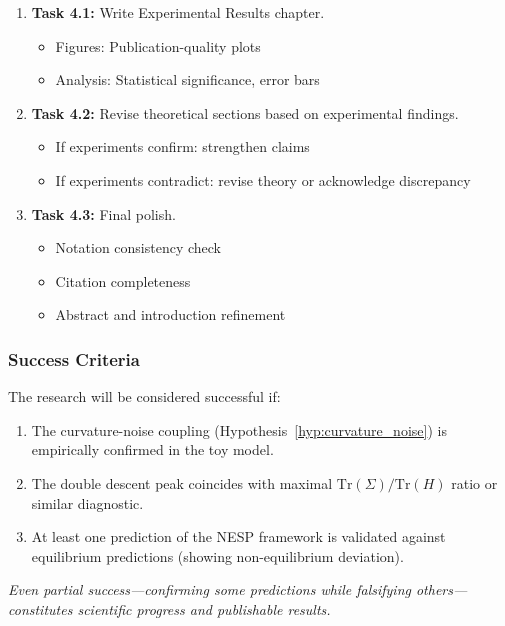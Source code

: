 \documentclass[
  journal=largetwo,
  year=2025,
  volume=37,
]{cup-journal}
\begin{document}
\begin{enumerate}
    \item[$\square$] \textbf{Task 4.1:} Write Experimental Results chapter.
    \begin{itemize}
        \item Figures: Publication-quality plots
        \item Analysis: Statistical significance, error bars
    \end{itemize}
    
    \item[$\square$] \textbf{Task 4.2:} Revise theoretical sections based on experimental findings.
    \begin{itemize}
        \item If experiments confirm: strengthen claims
        \item If experiments contradict: revise theory or acknowledge discrepancy
    \end{itemize}
    
    \item[$\square$] \textbf{Task 4.3:} Final polish.
    \begin{itemize}
        \item Notation consistency check
        \item Citation completeness
        \item Abstract and introduction refinement
    \end{itemize}
\end{enumerate}

\subsubsection{Success Criteria}

The research will be considered successful if:
\begin{enumerate}
    \item The curvature-noise coupling (Hypothesis~\ref{hyp:curvature_noise}) is empirically confirmed in the toy model.
    \item The double descent peak coincides with maximal $\text{Tr}(\Sigma)/\text{Tr}(H)$ ratio or similar diagnostic.
    \item At least one prediction of the NESP framework is validated against equilibrium predictions (showing non-equilibrium deviation).
\end{enumerate}

\textit{Even partial success---confirming some predictions while falsifying others---constitutes scientific progress and publishable results.}
\end{document}
